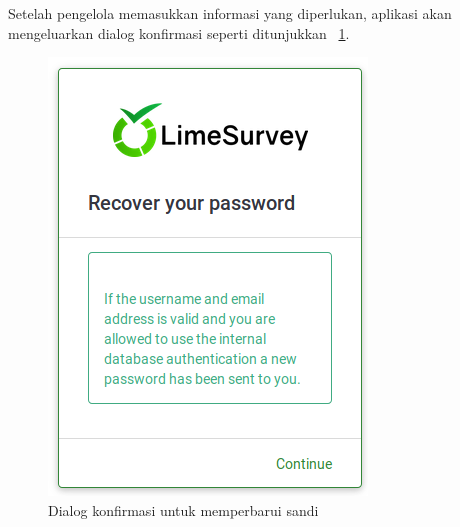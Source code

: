 Setelah pengelola memasukkan informasi yang diperlukan, aplikasi akan mengeluarkan dialog konfirmasi seperti ditunjukkan \figurename~\ref{fig:konfirmasiSandi}.
\begin{figure}
  \begin{center}
    \includegraphics[scale=.35]{pics/recoverPasswd1.png}
    \caption{Dialog konfirmasi untuk memperbarui sandi}
    \label{fig:konfirmasiSandi}
  \end{center}
\end{figure}
